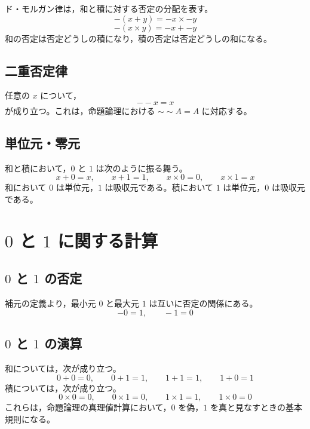 \documentclass[../main.tex]{subfiles}
\begin{document}
ド・モルガン律は，和と積に対する否定の分配を表す。
\[
  -(x+y) = -x \times -y
\]
\[
  -(x \times y) = -x + -y
\]
和の否定は否定どうしの積になり，積の否定は否定どうしの和になる。

\subsection{二重否定律}

任意の \(x\) について，
\[
  --x = x
\]
が成り立つ。これは，命題論理における \(\sim\sim A=A\) に対応する。

\subsection{単位元・零元}

和と積において，\(0\) と \(1\) は次のように振る舞う。
\[
  x+0=x,
  \qquad
  x+1=1,
  \qquad
  x \times 0=0,
  \qquad
  x \times 1=x
\]
和において \(0\) は単位元，\(1\) は吸収元である。積において \(1\) は単位元，\(0\) は吸収元である。

\section{\texorpdfstring{\(0\)}{0} と \texorpdfstring{\(1\)}{1} に関する計算}

\subsection{\texorpdfstring{\(0\)}{0} と \texorpdfstring{\(1\)}{1} の否定}

補元の定義より，最小元 \(0\) と最大元 \(1\) は互いに否定の関係にある。
\[
  -0 = 1,
  \qquad
  -1 = 0
\]

\subsection{\texorpdfstring{\(0\)}{0} と \texorpdfstring{\(1\)}{1} の演算}

和については，次が成り立つ。
\[
  0+0=0,
  \qquad
  0+1=1,
  \qquad
  1+1=1,
  \qquad
  1+0=1
\]
積については，次が成り立つ。
\[
  0 \times 0 = 0,
  \qquad
  0 \times 1 = 0,
  \qquad
  1 \times 1 = 1,
  \qquad
  1 \times 0 = 0
\]
これらは，命題論理の真理値計算において，\(0\) を偽，\(1\) を真と見なすときの基本規則になる。
\end{document}
